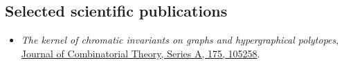\documentclass[margin, 10pt]{res} %
\begin{document}
\begin{resume}
%
%
%
%
%
%
%
%
%
%
%
%
%


\section{Selected scientific publications}


\begin{itemize}

\item {\sl The kernel of chromatic invariants on graphs and hypergraphical polytopes},  \href{https://www.sciencedirect.com/science/article/abs/pii/S0097316520300509?via%3Dihub}{Journal of Combinatorial Theory, Series A, 175, 105258}.


\end{itemize}
\end{resume}
\end{document}
